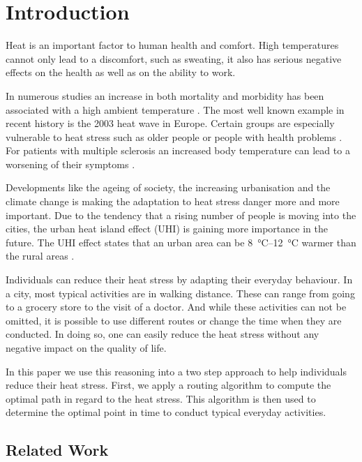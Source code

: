 
\section{Introduction}

Heat is an important factor to human health and comfort. High temperatures cannot only lead to a discomfort, such as sweating, it also has serious negative effects on the health as well as on the ability to work. 

In numerous studies an increase in both mortality and
morbidity has been associated with a high ambient temperature \parencite{Basu2009}. The most well known example in recent history is the 2003 heat wave in Europe. 
Certain groups are especially vulnerable to heat stress such as older people or people with health problems \parencite{Huebler2007}. For patients with multiple sclerosis an increased body temperature can lead to a worsening of their symptoms \parencite{Davis2010}.

Developments like the ageing of society, the increasing urbanisation and the climate change is making the adaptation to heat stress danger more and more important. Due to the tendency that a rising number of people is moving into the cities, the urban heat island effect (UHI) is gaining more importance in the future. The UHI effect states that an urban area can be  \SIrange{8}{12}{\celsius} warmer than the rural areas \parencite{Prashad2014}. 

Individuals can reduce their heat stress by adapting their everyday behaviour. In a city, most typical activities are in walking distance. These can range from going to a grocery store to the visit of a doctor. And while these activities can not be omitted, it is possible to use different routes or change the time when they are conducted. In doing so, one can easily reduce the heat stress without any negative impact on the quality of life. 

In this paper we use this reasoning into a two step approach to help individuals reduce their heat stress. First, we apply a routing algorithm to compute the optimal path in regard to the heat stress. This algorithm is then used to determine the optimal point in time to conduct typical everyday activities. 
  
\subsection{Related Work} 


